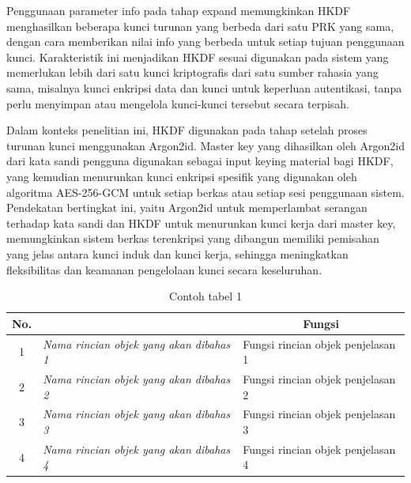 Penggunaan parameter info pada tahap expand memungkinkan HKDF menghasilkan beberapa kunci turunan yang berbeda dari satu PRK yang sama, dengan cara memberikan nilai info yang berbeda untuk setiap tujuan penggunaan kunci\cite{}. Karakteristik ini menjadikan HKDF sesuai digunakan pada sistem yang memerlukan lebih dari satu kunci kriptografis dari satu sumber rahasia yang sama, misalnya kunci enkripsi data dan kunci untuk keperluan autentikasi, tanpa perlu menyimpan atau mengelola kunci-kunci tersebut secara terpisah.

Dalam konteks penelitian ini, HKDF digunakan pada tahap setelah proses turunan kunci menggunakan Argon2id. Master key yang dihasilkan oleh Argon2id dari kata sandi pengguna digunakan sebagai input keying material bagi HKDF, yang kemudian menurunkan kunci enkripsi spesifik yang digunakan oleh algoritma AES-256-GCM untuk setiap berkas atau setiap sesi penggunaan sistem. Pendekatan bertingkat ini, yaitu Argon2id untuk memperlambat serangan terhadap kata sandi dan HKDF untuk menurunkan kunci kerja dari master key, memungkinkan sistem berkas terenkripsi yang dibangun memiliki pemisahan yang jelas antara kunci induk dan kunci kerja, sehingga meningkatkan fleksibilitas dan keamanan pengelolaan kunci secara keseluruhan\cite{}.

\begin{table}[H]
    \centering
    \caption{Contoh tabel 1}
    \label{t-blok}
    \begin{tabular}{|c|l|l|}
        \hline
        \rowcolor[HTML]{C0C0C0}
        {\color[HTML]{000000} No.} & 
        \multicolumn{1}{c|}{\cellcolor[HTML]{C0C0C0}{\color[HTML]{000000} Nama}} & 
        \multicolumn{1}{c|}{\cellcolor[HTML]{C0C0C0}Fungsi} \\ 
        \hline
        
        \rowcolor[HTML]{FFFFFF}
        1 & \textit{Nama rincian objek yang akan dibahas 1} & Fungsi rincian objek penjelasan 1 \\ \hline
        2 & \textit{Nama rincian objek yang akan dibahas 2} & Fungsi rincian objek penjelasan 2 \\ \hline
        3 & \textit{Nama rincian objek yang akan dibahas 3} & Fungsi rincian objek penjelasan 3 \\ \hline
        4 & \textit{Nama rincian objek yang akan dibahas 4} & Fungsi rincian objek penjelasan 4 \\ \hline
    \end{tabular}
\end{table}


